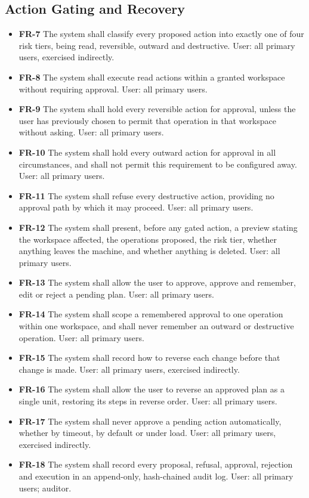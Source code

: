 \documentclass{FastFyp}
\begin{document}
\subsection{Action Gating and Recovery}
\begin{itemize}
    \item \textbf{FR-7} The system shall classify every proposed action into exactly one of four risk tiers, being read, reversible, outward and destructive. User: all primary users, exercised indirectly.
    \item \textbf{FR-8} The system shall execute read actions within a granted workspace without requiring approval. User: all primary users.
    \item \textbf{FR-9} The system shall hold every reversible action for approval, unless the user has previously chosen to permit that operation in that workspace without asking. User: all primary users.
    \item \textbf{FR-10} The system shall hold every outward action for approval in all circumstances, and shall not permit this requirement to be configured away. User: all primary users.
    \item \textbf{FR-11} The system shall refuse every destructive action, providing no approval path by which it may proceed. User: all primary users.
    \item \textbf{FR-12} The system shall present, before any gated action, a preview stating the workspace affected, the operations proposed, the risk tier, whether anything leaves the machine, and whether anything is deleted. User: all primary users.
    \item \textbf{FR-13} The system shall allow the user to approve, approve and remember, edit or reject a pending plan. User: all primary users.
    \item \textbf{FR-14} The system shall scope a remembered approval to one operation within one workspace, and shall never remember an outward or destructive operation. User: all primary users.
    \item \textbf{FR-15} The system shall record how to reverse each change before that change is made. User: all primary users, exercised indirectly.
    \item \textbf{FR-16} The system shall allow the user to reverse an approved plan as a single unit, restoring its steps in reverse order. User: all primary users.
    \item \textbf{FR-17} The system shall never approve a pending action automatically, whether by timeout, by default or under load. User: all primary users, exercised indirectly.
    \item \textbf{FR-18} The system shall record every proposal, refusal, approval, rejection and execution in an append-only, hash-chained audit log. User: all primary users; auditor.
\end{itemize}
\end{document}
